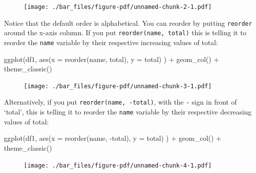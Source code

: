 \documentclass[
  letterpaper,
  DIV=11,
  numbers=noendperiod]{scrreprt}
\newenvironment{Shaded}{\begin{snugshade}}{\end{snugshade}}
\newcommand{\AttributeTok}[1]{\textcolor[rgb]{0.40,0.45,0.13}{#1}}
\newcommand{\FunctionTok}[1]{\textcolor[rgb]{0.28,0.35,0.67}{#1}}
\newcommand{\NormalTok}[1]{\textcolor[rgb]{0.00,0.23,0.31}{#1}}
\newcommand{\SpecialCharTok}[1]{\textcolor[rgb]{0.37,0.37,0.37}{#1}}
\begin{document}
\begin{figure}[H]

{\centering \texttt{[image: ./bar\_files/figure-pdf/unnamed-chunk-2-1.pdf]}

}

\end{figure}

Notice that the default order is alphabetical. You can reorder by
putting \texttt{reorder} around the x-axis column. If you put
\texttt{reorder(name,\ total)} this is telling it to reorder the
\texttt{name} variable by their respective increasing values of total:

\begin{Shaded}
\begin{Highlighting}[]
\FunctionTok{ggplot}\NormalTok{(df1, }\FunctionTok{aes}\NormalTok{(}\AttributeTok{x =} \FunctionTok{reorder}\NormalTok{(name, total), }\AttributeTok{y =}\NormalTok{ total) ) }\SpecialCharTok{+}
  \FunctionTok{geom\_col}\NormalTok{() }\SpecialCharTok{+}
  \FunctionTok{theme\_classic}\NormalTok{()}
\end{Highlighting}
\end{Shaded}

\begin{figure}[H]

{\centering \texttt{[image: ./bar\_files/figure-pdf/unnamed-chunk-3-1.pdf]}

}

\end{figure}

Alternatively, if you put \texttt{reorder(name,\ -total)}, with the
\texttt{-} sign in front of `total', this is telling it to reorder the
\texttt{name} variable by their respective decreasing values of total:

\begin{Shaded}
\begin{Highlighting}[]
\FunctionTok{ggplot}\NormalTok{(df1, }\FunctionTok{aes}\NormalTok{(}\AttributeTok{x =} \FunctionTok{reorder}\NormalTok{(name, }\SpecialCharTok{{-}}\NormalTok{total), }\AttributeTok{y =}\NormalTok{ total) ) }\SpecialCharTok{+} 
  \FunctionTok{geom\_col}\NormalTok{() }\SpecialCharTok{+}
  \FunctionTok{theme\_classic}\NormalTok{()}
\end{Highlighting}
\end{Shaded}

\begin{figure}[H]

{\centering \texttt{[image: ./bar\_files/figure-pdf/unnamed-chunk-4-1.pdf]}

}

\end{figure}
\end{document}
